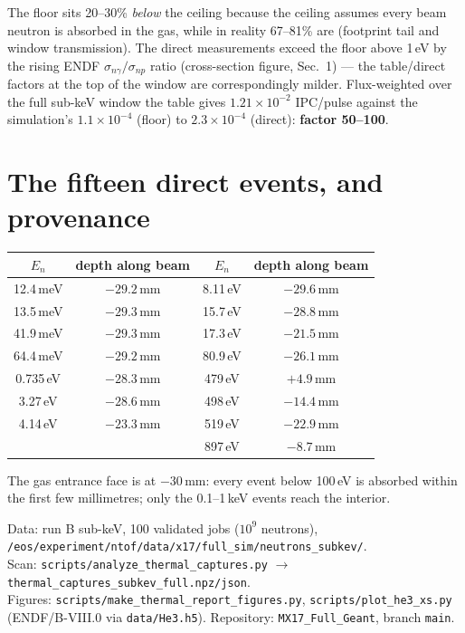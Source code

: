 \documentclass[11pt,a4paper]{article}
\newcommand{\snp}{\sigma_{np}}
\newcommand{\sng}{\sigma_{n\gamma}}
\begin{document}
\noindent The floor sits 20--30\% \emph{below} the ceiling because the
ceiling assumes every beam neutron is absorbed in the gas, while in reality
67--81\% are (footprint tail and window transmission). The direct
measurements exceed the floor above 1\,eV by the rising ENDF
$\sng/\snp$ ratio (cross-section figure, Sec.~1) --- the table/direct
factors at the top of the window are correspondingly milder. Flux-weighted
over the full sub-keV window the table gives $1.21\times10^{-2}$ IPC/pulse
against the simulation's $1.1\times10^{-4}$ (floor) to
$2.3\times10^{-4}$ (direct): \textbf{factor 50--100}.

\section{The fifteen direct events, and provenance}

\begin{center}
\begin{tabular}{cc|cc}
\hline
$E_n$ & depth along beam & $E_n$ & depth along beam \\
\hline
12.4\,meV & $-29.2$\,mm & 8.11\,eV  & $-29.6$\,mm \\
13.5\,meV & $-29.3$\,mm & 15.7\,eV  & $-28.8$\,mm \\
41.9\,meV & $-29.3$\,mm & 17.3\,eV  & $-21.5$\,mm \\
64.4\,meV & $-29.2$\,mm & 80.9\,eV  & $-26.1$\,mm \\
0.735\,eV & $-28.3$\,mm & 479\,eV   & $+4.9$\,mm  \\
3.27\,eV  & $-28.6$\,mm & 498\,eV   & $-14.4$\,mm \\
4.14\,eV  & $-23.3$\,mm & 519\,eV   & $-22.9$\,mm \\
          &             & 897\,eV   & $-8.7$\,mm  \\
\hline
\end{tabular}
\end{center}

\noindent The gas entrance face is at $-30$\,mm: every event below
100\,eV is absorbed within the first few millimetres; only the
0.1--1\,keV events reach the interior.

\medskip
\noindent Data: run B sub-keV, 100 validated jobs
($10^{9}$ neutrons), \\
\texttt{/eos/experiment/ntof/data/x17/full\_sim/neutrons\_subkev/}. \\
Scan: \texttt{scripts/analyze\_thermal\_captures.py} $\to$
\texttt{thermal\_captures\_subkev\_full.npz/json}. \\
Figures: \texttt{scripts/make\_thermal\_report\_figures.py},
\texttt{scripts/plot\_he3\_xs.py} (ENDF/B-VIII.0 via \texttt{data/He3.h5}).
Repository: \texttt{MX17\_Full\_Geant}, branch \texttt{main}.
\end{document}
